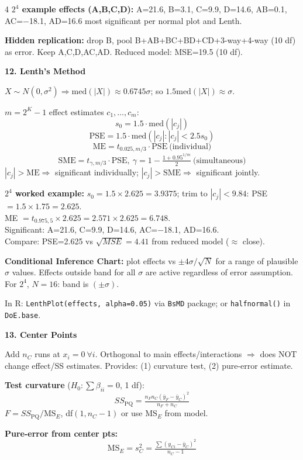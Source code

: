 \documentclass[7pt,letterpaper,landscape]{extarticle}
\newcommand{\secbar}[1]{%
  \vspace{2pt}%
  {\colorbox{black!80}{\parbox{\dimexpr\linewidth-2\fboxsep}{\color{white}\small\bfseries #1}}}\par%
  \vspace{1pt}%
}
\newcommand{\MSE}{\mathrm{MS}_E}
\begin{document}
\begin{multicols*}{4}
\textbf{$2^4$ example effects (A,B,C,D):} A=21.6, B=3.1, C=9.9, D=14.6, AB=0.1, AC=$-$18.1, AD=16.6 most significant per normal plot and Lenth.

\textbf{Hidden replication:} drop B, pool B+AB+BC+BD+CD+3-way+4-way (10 df) as error. Keep A,C,D,AC,AD. Reduced model: MSE=19.5 (10 df).

\secbar{12. Lenth's Method}
$X\sim N(0,\sigma^2)\Rightarrow\mathrm{med}(|X|)\approx 0.6745\sigma$; so $1.5\mathrm{med}(|X|)\approx\sigma$.

$m{=}2^K{-}1$ effect estimates $c_1,\ldots,c_m$:
\[s_0{=}1.5\cdot\mathrm{med}(|c_j|)\]
\[\boxed{\mathrm{PSE}{=}1.5\cdot\mathrm{med}(|c_j|:|c_j|{<}2.5s_0)}\]
\[\mathrm{ME}{=}t_{0.025,m/3}\cdot\mathrm{PSE}\ \text{(individual)}\]
\[\mathrm{SME}{=}t_{\gamma,m/3}\cdot\mathrm{PSE},\ \gamma{=}1{-}\tfrac{1+0.95^{1/m}}{2}\ \text{(simultaneous)}\]
$|c_j|{>}\mathrm{ME}\Rightarrow$ significant individually; $|c_j|{>}\mathrm{SME}\Rightarrow$ significant jointly.

\textbf{$2^4$ worked example:}
$s_0{=}1.5\times2.625{=}3.9375$; trim to $|c_j|{<}9.84$: PSE$=1.5\times1.75{=}2.625$.\\
ME $= t_{0.975,5}\times2.625{=}2.571\times2.625{=}6.748$.\\
Significant: A=21.6, C=9.9, D=14.6, AC=$-$18.1, AD=16.6.\\
Compare: PSE=2.625 vs $\sqrt{MSE}{=}4.41$ from reduced model ($\approx$ close).

\textbf{Conditional Inference Chart:} plot effects vs $\pm4\sigma/\sqrt{N}$ for a range of plausible $\sigma$ values. Effects outside band for all $\sigma$ are active regardless of error assumption. For $2^4$, $N=16$: band is $(\pm\sigma)$.

In R: \texttt{LenthPlot(effects, alpha=0.05)} via \texttt{BsMD} package; or \texttt{halfnormal()} in \texttt{DoE.base}.

\secbar{13. Center Points}
Add $n_C$ runs at $x_i{=}0\ \forall i$. Orthogonal to main effects/interactions $\Rightarrow$ does NOT change effect/SS estimates. Provides: (1) curvature test, (2) pure-error estimate.

\textbf{Test curvature} ($H_0{:}\sum\beta_{ii}{=}0$, 1 df):
\[SS_{\text{PQ}}{=}\tfrac{n_F n_C(\bar y_F{-}\bar y_C)^2}{n_F+n_C}\]
$F{=}SS_{\text{PQ}}/\MSE$, df$(1,n_C-1)$ or use $\MSE$ from model.

\textbf{Pure-error from center pts:}
\[\MSE{=}s_C^2{=}\tfrac{\sum(y_{Ci}-\bar y_C)^2}{n_C-1}\]


\end{multicols*}
\end{document}
